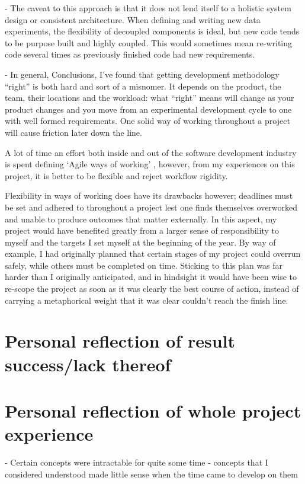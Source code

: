 - The caveat to this approach is that it does not lend itself to a holistic
system design or consistent architecture. When defining and writing new
data experiments, the flexibility of decoupled components is ideal, but new code
tends to be purpose built and highly coupled. This would sometimes mean
re-writing code several times as previously finished code had new requirements. 

- In general, Conclusions, I’ve found that getting development methodology
“right” is both hard and sort of a misnomer. It depends on the product, the
team, their locations and the workload: what “right” means will change as your
product changes and you move from an experimental development cycle to one with
well formed requirements. One solid way of working throughout a project will
cause friction later down the line. 

A lot of time an effort both inside and out of the software development industry
is spent defining `Agile ways of working' \autocite{spolsky_you_2006}, however, from my experiences on this
project, it is better to be flexible and reject workflow rigidity. 

Flexibility in ways of working does have its drawbacks however; deadlines must
be set and adhered to throughout a project lest one finds themselves overworked
and unable to produce outcomes that matter externally. In this aspect, my
project would have benefited greatly from a larger sense of responsibility to
myself and the targets I set myself at the beginning of the year. By way of
example, I had originally planned that certain stages of my project could
overrun safely, while others must be completed on time. Sticking to this plan
was far harder than I originally anticipated, and in hindsight it would have been
wise to re-scope the project as soon as it was clearly the best course of action,
instead of carrying a metaphorical weight that it was clear couldn't reach the
finish line.

\section{Personal reflection of result success/lack thereof}

\section{Personal reflection of whole project experience}
 - Certain concepts were intractable for quite some time 
 - concepts that I considered understood made little sense when the time came to
 develop on them 


